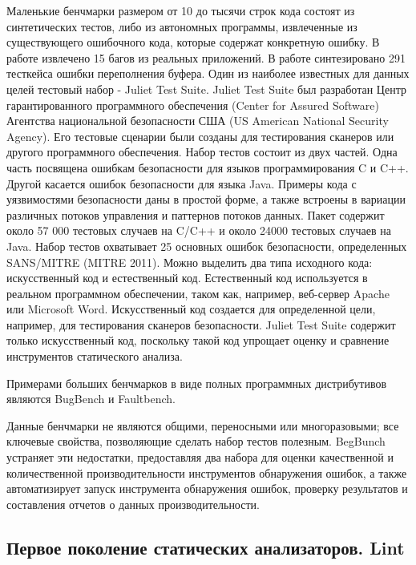 Маленькие бенчмарки размером от 10 до тысячи строк кода состоят из синтетических тестов, либо из автономных программы, извлеченные из существующего 
ошибочного кода, которые содержат конкретную ошибку. В работе\autocite{Zitser} извлечено 15 багов из реальных приложений. В работе\autocite{Kratkiewicz} синтезировано 
291 тесткейса ошибки переполнения буфера. Один из наиболее известных для данных целей тестовый набор - Juliet Test Suite\autocite{NIST}. Juliet Test Suite был разработан Центр гарантированного 
программного обеспечения (Center for Assured Software) Агентства национальной безопасности США (US American National Security Agency).
Его тестовые сценарии были созданы для тестирования сканеров или другого программного обеспечения. Набор тестов состоит из двух частей. Одна часть 
посвящена ошибкам безопасности для языков программирования C и C++. Другой касается ошибок безопасности для языка Java. Примеры кода с уязвимостями 
безопасности даны в простой форме, а также встроены в вариации различных потоков управления и паттернов потоков данных. Пакет содержит около 57 000 
тестовых случаев на C/C++ и около 24000 тестовых случаев на Java. Набор тестов охватывает 25 основных ошибок безопасности, определенных SANS/MITRE 
(MITRE 2011)\autocite{MITRE}. Можно выделить два типа исходного кода: искусственный код и естественный код. Естественный код используется в реальном программном обеспечении, таком 
как, например, веб-сервер Apache или Microsoft Word. Искусственный код создается для определенной цели, например, для тестирования сканеров 
безопасности. Juliet Test Suite содержит только искусственный код, поскольку такой код упрощает оценку и сравнение инструментов статического анализа. 

Примерами больших бенчмарков в виде полных программных дистрибутивов являются BugBench\autocite{BugBench} и Faultbench\autocite{Faultbench}.

Данные бенчмарки не являются общими, переносными или многоразовыми; все ключевые свойства, позволяющие сделать набор тестов полезным.  
BegBunch\autocite{BegBunch} устраняет эти недостатки, предоставляя два набора для оценки качественной и количественной производительности инструментов 
обнаружения ошибок, а также автоматизирует запуск  инструмента обнаружения ошибок, проверку результатов и составления отчетов о данных производительности. 

\subsection{Первое поколение статических анализаторов. Lint}

